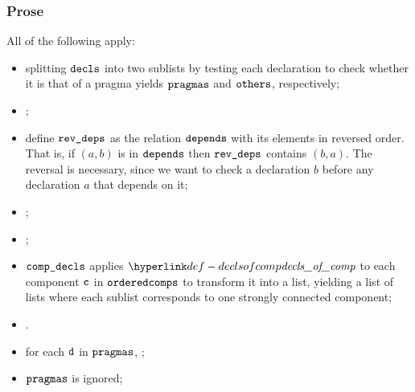 \subsubsection{Prose}
All of the following apply:
\begin{itemize}
  \item splitting $\texttt{decls}$ into two sublists by testing each declaration to check whether
        it is that of a pragma yields $\texttt{pragmas}$ and $\texttt{others}$, respectively;
  \item {};
  \item define $\reverseddependencies$ as the relation $\texttt{depends}$ with its elements in reversed order.
        That is, if $(a,b)$ is in $\texttt{depends}$ then $\reverseddependencies$ contains $(b, a)$.
        The reversal is necessary, since we want to check a declaration $b$ before any declaration $a$
        that depends on it;
  \item {};
  \item \Prosetopologicalorderingcomps{$\comps$}{$\reverseddependencies$}{$\orderedcomps$};
  \item $\compdecls$ applies $\declsofcomp$ to each component $\texttt{c}$ in $\orderedcomps$ to transform it into a list,
        yielding a list of lists where each sublist corresponds to one strongly connected component;
  \item \Proseannotatedeclcomps{$\genv$}{$\compdecls$}{$\newdecls$}{$\newtenv$\ProseOrTypeError}.
  \item for each $\vd$ in $\texttt{pragmas}$, \Prosecheckglobalpragma{$\newtenv$}{$\vd$}\ProseOrTypeError;
  \item $\texttt{pragmas}$ is ignored;
\end{itemize}

